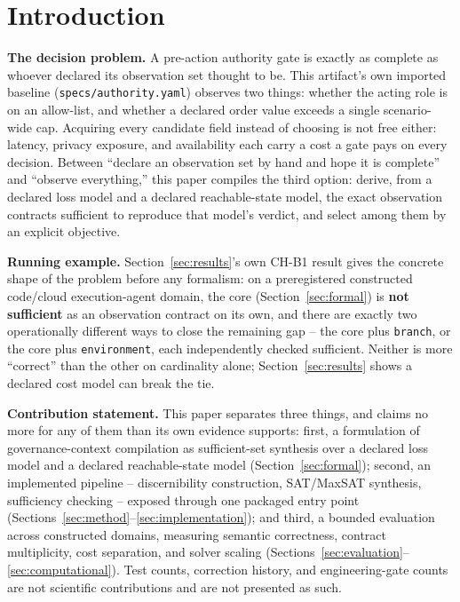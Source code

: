 \documentclass[11pt,a4paper]{article}
\theoremstyle{definition}
\begin{document}
\begin{abstract}
declared-only baseline is not exactly sufficient on any of them. Every selected contract is checked for sufficiency, with a concrete counterexample returned on failure and a check summary (a partition-cell count and a uniformity flag, not a portable certificate) on success; this is the compiler-focused scope of the two-scope table in Section~\ref{sec:conclusion} -- a separately coded, independently specified end-to-end case study is registered follow-up work, not claimed here.
\end{abstract}

\section{Introduction}
\label{sec:intro}

\noindent\textbf{The decision problem.} A pre-action authority gate is exactly as complete as whoever declared its observation set thought to be. This artifact's own imported baseline (\texttt{specs/authority.yaml}) observes two things: whether the acting role is on an allow-list, and whether a declared order value exceeds a single scenario-wide cap. Acquiring every candidate field instead of choosing is not free either: latency, privacy exposure, and availability each carry a cost a gate pays on every decision. Between ``declare an observation set by hand and hope it is complete'' and ``observe everything,'' this paper compiles the third option: derive, from a declared loss model and a declared reachable-state model, the exact observation contracts sufficient to reproduce that model's verdict, and select among them by an explicit objective.

\noindent\textbf{Running example.} Section~\ref{sec:results}'s own CH-B1 result gives the concrete shape of the problem before any formalism: on a preregistered constructed code/cloud execution-agent domain, the core (Section~\ref{sec:formal}) is \textbf{not sufficient} as an observation contract on its own, and there are exactly two operationally different ways to close the remaining gap -- the core plus \texttt{branch}, or the core plus \texttt{environment}, each independently checked sufficient. Neither is more ``correct'' than the other on cardinality alone; Section~\ref{sec:results} shows a declared cost model can break the tie.

\noindent\textbf{Contribution statement.} This paper separates three things, and claims no more for any of them than its own evidence supports: first, a formulation of governance-context compilation as sufficient-set synthesis over a declared loss model and a declared reachable-state model (Section~\ref{sec:formal}); second, an implemented pipeline -- discernibility construction, SAT/MaxSAT synthesis, sufficiency checking -- exposed through one packaged entry point (Sections~\ref{sec:method}--\ref{sec:implementation}); and third, a bounded evaluation across constructed domains, measuring semantic correctness, contract multiplicity, cost separation, and solver scaling (Sections~\ref{sec:evaluation}--\ref{sec:computational}). Test counts, correction history, and engineering-gate counts are not scientific contributions and are not presented as such.
\end{document}
